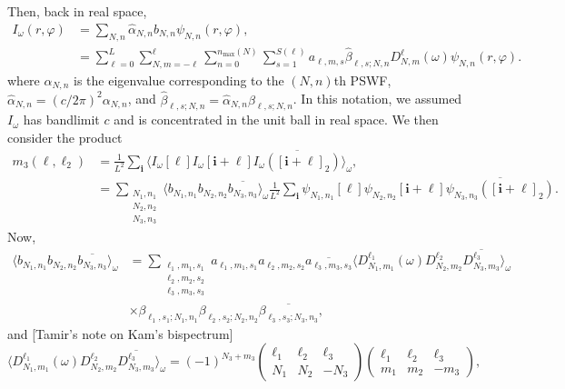 \documentclass[english,11pt]{article}
\newcommand{\1}{\mathbf{1}}
\newcommand{\mb}{\mathbf}
\newcommand*\Bell{\ensuremath{\boldsymbol\ell}}
\numberwithin{equation}{section}
\theoremstyle{plain}
\theoremstyle{definition}
\theoremstyle{remark}
\theoremstyle{plain}
\theoremstyle{remark}
\theoremstyle{plain}
\theoremstyle{plain}
\begin{document}
Then, back in real space,
\[\begin{aligned} I_{\omega}(r,\varphi) &= \sum_{N,n}\widehat{\alpha}_{N,n}b_{N,n}\psi_{N,n}(r,\varphi),\\
&= \sum_{\ell=0}^L\sum_{N,m=-\ell}^{\ell}\sum_{n=0}^{n_{\text{max}}(N)}\sum_{s=1}^{S(\ell)}a_{\ell,m,s}\widehat\beta_{\ell,s;N,n}D_{N,m}^{\ell}(\omega)\psi_{N,n}(r,\varphi).
\end{aligned}\]
where $\alpha_{N,n}$ is the eigenvalue corresponding to the $(N,n)$th PSWF, $\widehat{\alpha}_{N,n} = (c/2\pi)^2\alpha_{N,n}$, and $\widehat\beta_{\ell,s;N,n}=\widehat\alpha_{N,n}\beta_{\ell,s;N,n}$. In this notation, we assumed $I_{\omega}$ has bandlimit $c$ and is concentrated in the unit ball in real space. We then consider the product
\[\begin{aligned} m_3(\Bell,\Bell_2) &= \frac{1}{L^2}\sum_{\mb i}\langle I_{\omega}[\Bell]I_{\omega}[\mb i+\Bell]\overline{I_{\omega}([\mb i+\Bell]_2)}\rangle_{\omega},\\
&= \sum_{\substack{N_1,n_1\\N_2,n_2\\N_3,n_3}} \langle b_{N_1,n_1}b_{N_2,n_2}\overline{b_{N_3,n_3}}\rangle_{\omega}\frac{1}{L^2}\sum_{\mb i}\psi_{N_1,n_1}[\Bell]\psi_{N_2,n_2}[\mb i+\Bell]\overline{\psi_{N_3,n_3}([\mb i+\Bell]_2)}.\end{aligned}\]
Now,
\[\begin{aligned} \langle b_{N_1,n_1}b_{N_2,n_2}\overline{b_{N_3,n_3}}\rangle_{\omega} &= \sum_{\substack{\ell_1,m_1,s_1\\\ell_2,m_2,s_2\\\ell_3,m_3,s_3}}a_{\ell_1,m_1,s_1}a_{\ell_2,m_2,s_2}\overline{a_{\ell_3,m_3,s_3}}\langle D_{N_1,m_1}^{\ell_1}(\omega)D_{N_2,m_2}^{\ell_2}\overline{D_{N_3,m_3}^{\ell_3}}\rangle_{\omega}\\
&\times \beta_{\ell_1,s_1;N_1,n_1}\beta_{\ell_2,s_2;N_2,n_2}\overline{\beta_{\ell_3,s_3;N_3,n_3}},\end{aligned}\]
and [Tamir's note on Kam's bispectrum]
\[ \langle D_{N_1,m_1}^{\ell_1}(\omega)D_{N_2,m_2}^{\ell_2}\overline{D_{N_3,m_3}^{\ell_3}}\rangle_{\omega} = (-1)^{N_3+m_3}\left(\begin{array}{ccc}\ell_1 & \ell_2  & \ell_3\\ N_1 & N_2 & -N_3\end{array}\right)\left(\begin{array}{ccc}\ell_1 & \ell_2  & \ell_3\\ m_1 & m_2 & -m_3\end{array}\right),\
\]
\end{document}
